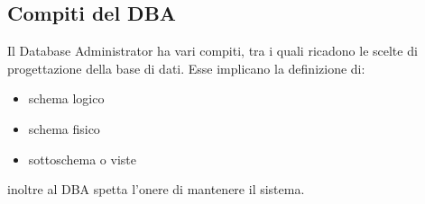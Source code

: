  \subsection{Compiti del DBA}
 Il Database Administrator ha vari compiti, tra i quali ricadono le scelte di progettazione
 della base di dati. Esse implicano la definizione di:
 \begin{itemize}
  \item schema logico
  \item schema fisico
  \item sottoschema o viste
 \end{itemize}
 inoltre al DBA spetta l'onere di mantenere il sistema.





